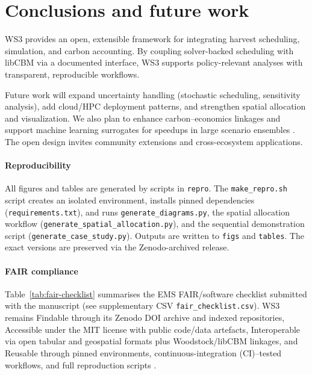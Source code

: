 \documentclass[review]{elsarticle}
\begin{document}
\section{Conclusions and future work}
WS3 provides an open, extensible framework for integrating harvest scheduling, simulation, and carbon accounting. By coupling solver-backed scheduling with libCBM via a documented interface, WS3 supports policy-relevant analyses with transparent, reproducible workflows.

Future work will expand uncertainty handling (stochastic scheduling, sensitivity analysis), add cloud/HPC deployment patterns, and strengthen spatial allocation and visualization. We also plan to enhance carbon–economics linkages and support machine learning surrogates for speedups in large scenario ensembles \citep{forrester2008surrogatemodelling}. The open design invites community extensions and cross-ecosystem applications.

\paragraph{Reproducibility}
All figures and tables are generated by scripts in \texttt{repro}. The \texttt{make\_repro.sh} script creates an isolated environment, installs pinned dependencies (\texttt{requirements.txt}), and runs \texttt{generate\_diagrams.py}, the spatial allocation workflow (\texttt{generate\_spatial\_allocation.py}), and the sequential demonstration script (\texttt{generate\_case\_study.py}). Outputs are written to \texttt{figs} and \texttt{tables}. The exact versions are preserved via the Zenodo-archived release.

\paragraph{FAIR compliance}
Table~\ref{tab:fair-checklist} summarises the EMS FAIR/software checklist submitted with the manuscript (see supplementary CSV \texttt{fair\_checklist.csv}). WS3 remains Findable through its Zenodo DOI archive and indexed repositories, Accessible under the MIT license with public code/data artefacts, Interoperable via open tabular and geospatial formats plus Woodstock/libCBM linkages, and Reusable through pinned environments, continuous-integration (CI)–tested workflows, and full reproduction scripts \citep{ws3_zenodo2025}.
\end{document}
